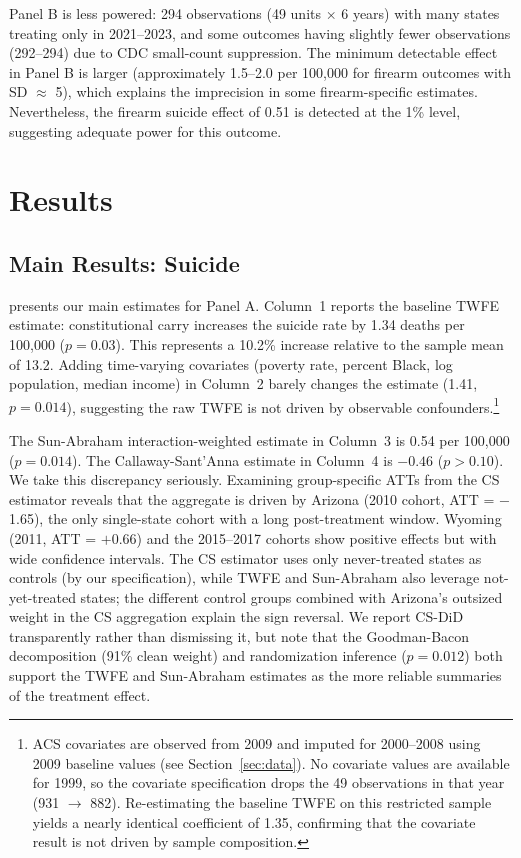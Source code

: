 \documentclass[12pt]{article}
\begin{document}
Panel B is less powered: 294 observations (49 units $\times$ 6 years) with many states treating only in 2021--2023, and some outcomes having slightly fewer observations (292--294) due to CDC small-count suppression. The minimum detectable effect in Panel B is larger (approximately 1.5--2.0 per 100,000 for firearm outcomes with SD $\approx$ 5), which explains the imprecision in some firearm-specific estimates. Nevertheless, the firearm suicide effect of 0.51 is detected at the 1\% level, suggesting adequate power for this outcome.


\section{Results}\label{sec:results}

\subsection{Main Results: Suicide}

 presents our main estimates for Panel A. Column~1 reports the baseline TWFE estimate: constitutional carry increases the suicide rate by 1.34 deaths per 100,000 ($p = 0.03$). This represents a 10.2\% increase relative to the sample mean of 13.2. Adding time-varying covariates (poverty rate, percent Black, log population, median income) in Column~2 barely changes the estimate (1.41, $p = 0.014$), suggesting the raw TWFE is not driven by observable confounders.\footnote{ACS covariates are observed from 2009 and imputed for 2000--2008 using 2009 baseline values (see Section~\ref{sec:data}). No covariate values are available for 1999, so the covariate specification drops the 49 observations in that year (931 $\to$ 882). Re-estimating the baseline TWFE on this restricted sample yields a nearly identical coefficient of 1.35, confirming that the covariate result is not driven by sample composition.}

The Sun-Abraham interaction-weighted estimate in Column~3 is 0.54 per 100,000 ($p = 0.014$). The Callaway-Sant'Anna estimate in Column~4 is $-0.46$ ($p > 0.10$). We take this discrepancy seriously. Examining group-specific ATTs from the CS estimator reveals that the aggregate is driven by Arizona (2010 cohort, ATT = $-$1.65), the only single-state cohort with a long post-treatment window. Wyoming (2011, ATT = $+$0.66) and the 2015--2017 cohorts show positive effects but with wide confidence intervals. The CS estimator uses only never-treated states as controls (by our specification), while TWFE and Sun-Abraham also leverage not-yet-treated states; the different control groups combined with Arizona's outsized weight in the CS aggregation explain the sign reversal. We report CS-DiD transparently rather than dismissing it, but note that the Goodman-Bacon decomposition (91\% clean weight) and randomization inference ($p = 0.012$) both support the TWFE and Sun-Abraham estimates as the more reliable summaries of the treatment effect.
\end{document}
